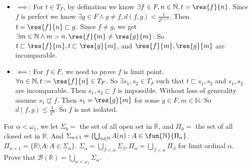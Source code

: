 \documentclass{ctexart}
\begin{document}
\begin{solution}
  \begin{itemize}
    \item \(\implies\): For \(t \in T_F\), by defination we know \(\exists f \in F,n \in \mathbb{N},t =\res{f}{n}\).
      Since \(f\) is perfect we know \(\exists g \in F \wedge g \neq f,d(f,g)<\frac{1}{2^{n+1}}\). 
      Then \(t =\res{f}{n} \sqsubset g\). Since \(f \neq g\), we get \(\exists m \in \mathbb{N} \wedge m >n,\res{f}{m}\neq \res{g}{m}\). 
      So \(t \sqsubset \res{f}{m},t \sqsubset \res{g}{m}\), and \(\res{f}{m},\res{g}{m}\) are incomparable. 
    \item \(\impliedby\): For \(f \in F\), we need to prove \(f\) is limit point. 
      \(\forall n \in \mathbb{N},t:=\res{f}{n} \in T_F\). 
      So \(\exists s_1,s_2 \in T_F\) such that \(t \sqsubset s_1,s_2\) and \(s_1,s_2\) are incomparable. 
      Then \(s_1,s_2 \sqsubset f\) is impossible. Without loss of generality assume \(s_1 \not \sqsubset f\). 
      Then \(s_1=\res{g}{m}\) for some \(g \in F,m \in \mathbb{N}\). 
      So \(d(f,g) \leq \frac{1}{2^n}\). So \(f\) is not isolated. 
  \end{itemize}
\end{solution}

\begin{problem}
  For \(\alpha <\omega_1\), we let \(\Sigma_0=\) the set of all open set in \(\mathbb{R}\), 
  and \(\Pi_0=\) the set of all closed set in \(\mathbb{R}\). 
  And \(\Sigma_{\alpha+1}=\{\bigcup_{n \in \mathbb{N}} A(n):A \in \fun{\mathbb{N}}{\Pi_{\alpha}}\). 
  \(\Pi_{\alpha+1}=\{\mathbb{R}\setminus A:A \in \Sigma_{\alpha}\}\). 
  \(\Sigma_{\alpha}=\bigcup_{\beta<\alpha} \Sigma_{\beta},\Pi_{\alpha}=\bigcup_{\beta<\alpha} \Pi _{\beta}\) for limit ordinal \(\alpha\). 
  Prove that \(\mathcal{B}(\mathbb{R})=\bigcup_{\alpha<\omega_1} \Sigma_{\alpha}\). 
\end{problem}
\end{document}
